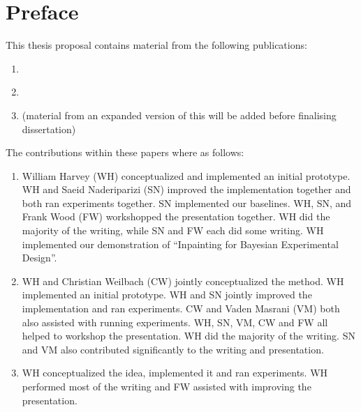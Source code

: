 
\chapter{Preface}

This thesis proposal contains material from the following publications:
\begin{enumerate}
    \item \citet{harvey2021conditional}
    \item \citet{harvey2022flexible}
    \item \citet{harvey2023visual} (material from an expanded version of this will be added before finalising dissertation)
\end{enumerate}

The contributions within these papers where as follows:
\begin{enumerate}
    \item William Harvey (WH) conceptualized and implemented an initial prototype. WH and Saeid Naderiparizi (SN) improved the implementation together and both ran experiments together.  SN implemented our baselines. WH, SN, and Frank Wood (FW) workshopped the presentation together. WH did the majority of the writing, while SN and FW each did some writing. WH implemented our demonstration of ``Inpainting for Bayesian Experimental Design''.
    \item WH and Christian Weilbach (CW) jointly conceptualized the method. WH implemented an initial prototype. WH and SN jointly improved the implementation and ran experiments. CW and Vaden Masrani (VM) both also assisted with running experiments. WH, SN, VM, CW and FW all helped to workshop the presentation. WH did the majority of the writing. SN and VM also contributed significantly to the writing and presentation.
    \item WH conceptualized the idea, implemented it and ran experiments. WH performed most of the writing and FW assisted with improving the presentation.
\end{enumerate}